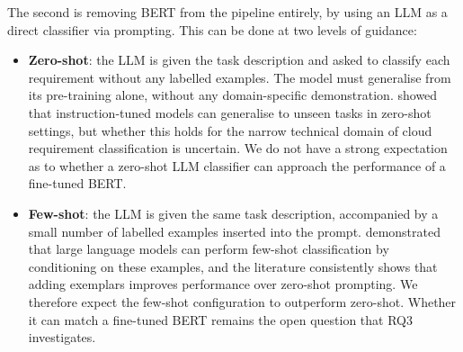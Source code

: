 The second is removing BERT from the pipeline entirely, by using an LLM as a direct classifier via prompting. This can be done at two levels of guidance:

\begin{itemize}
    \item \textbf{Zero-shot}: the LLM is given the task description and asked to classify each requirement without any labelled examples. The model must generalise from its pre-training alone, without any domain-specific demonstration. \cite{wei2022flan} showed that instruction-tuned models can generalise to unseen tasks in zero-shot settings, but whether this holds for the narrow technical domain of cloud requirement classification is uncertain. We do not have a strong expectation as to whether a zero-shot LLM classifier can approach the performance of a fine-tuned BERT.

    \item \textbf{Few-shot}: the LLM is given the same task description, accompanied by a small number of labelled examples inserted into the prompt. \cite{brown2020gpt3} demonstrated that large language models can perform few-shot classification by conditioning on these examples, and the literature consistently shows that adding exemplars improves performance over zero-shot prompting. We therefore expect the few-shot configuration to outperform zero-shot. Whether it can match a fine-tuned BERT remains the open question that RQ3 investigates.
\end{itemize}
